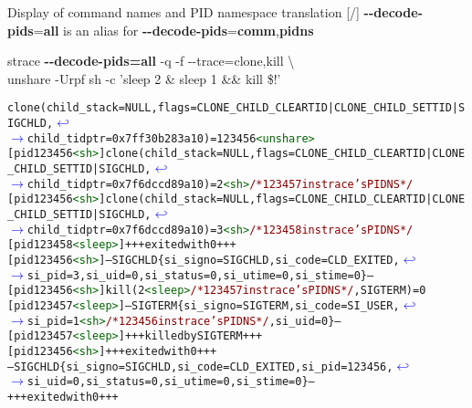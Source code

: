 \documentclass[unicode,aspectratio=169,xcolor={table,dvipsnames,usernames}]{beamer}
\newcommand{\symlinebreak}{\textcolor{blue}{\(\hookleftarrow\)}}
\newcommand{\symlinecont}{\textcolor{blue}{\(\longrightarrow\)}}
\begin{document}
\begin{frame}[fragile]{Display of command names and PID namespace translation \hfill [\insertframenumber/\inserttotalframenumber]}
\large
\textbf{-{}-decode-pids}=\textbf{all} is an alias for \textbf{-{}-decode-pids}=\textbf{comm},\textbf{pidns}
\begin{block}{strace \textbf{-{}-decode-pids=all} -q -f -{}-trace=clone,kill \textbackslash \\ unshare -Urpf sh -c 'sleep 2 \& sleep 1 \&\& kill \$!'}
\scriptsize
\begin{alltt}
clone(child_stack=NULL, flags=CLONE_CHILD_CLEARTID|CLONE_CHILD_SETTID|SIGCHLD, \symlinebreak
\symlinecont child_tidptr=0x7ff30b283a10) = 123456\textcolor{darkgreen}{<unshare>}
[pid 123456\textcolor{darkgreen}{<sh>}] clone(child_stack=NULL, flags=CLONE_CHILD_CLEARTID|CLONE_CHILD_SETTID|SIGCHLD, \symlinebreak
\symlinecont child_tidptr=0x7f6dccd89a10) = 2\textcolor{darkgreen}{<sh>} \textcolor{darkred}{/* 123457 in strace's PID NS */}
[pid 123456\textcolor{darkgreen}{<sh>}] clone(child_stack=NULL, flags=CLONE_CHILD_CLEARTID|CLONE_CHILD_SETTID|SIGCHLD, \symlinebreak
\symlinecont child_tidptr=0x7f6dccd89a10) = 3\textcolor{darkgreen}{<sh>} \textcolor{darkred}{/* 123458 in strace's PID NS */}
[pid 123458\textcolor{darkgreen}{<sleep>}] +++ exited with 0 +++
[pid 123456\textcolor{darkgreen}{<sh>}] --- SIGCHLD \{si_signo=SIGCHLD, si_code=CLD_EXITED, \symlinebreak
\symlinecont si_pid=3, si_uid=0, si_status=0, si_utime=0, si_stime=0\} ---
[pid 123456\textcolor{darkgreen}{<sh>}] kill(2\textcolor{darkgreen}{<sleep>} \textcolor{darkred}{/* 123457 in strace's PID NS */}, SIGTERM) = 0
[pid 123457\textcolor{darkgreen}{<sleep>}] --- SIGTERM \{si_signo=SIGTERM, si_code=SI_USER, \symlinebreak
\symlinecont si_pid=1\textcolor{darkgreen}{<sh>} \textcolor{darkred}{/* 123456 in strace's PID NS */}, si_uid=0\} ---
[pid 123457\textcolor{darkgreen}{<sleep>}] +++ killed by SIGTERM +++
[pid 123456\textcolor{darkgreen}{<sh>}] +++ exited with 0 +++
--- SIGCHLD \{si_signo=SIGCHLD, si_code=CLD_EXITED, si_pid=123456, \symlinebreak
\symlinecont si_uid=0, si_status=0, si_utime=0, si_stime=0\} ---
+++ exited with 0 +++
\end{alltt}
\end{block}
\end{frame}
\end{document}
